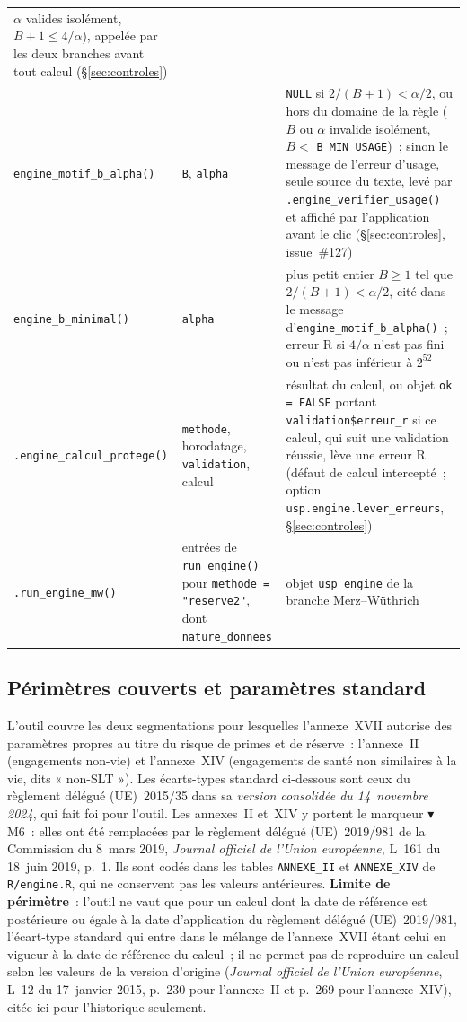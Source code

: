 \documentclass[a4paper,11pt]{article}
\newcommand{\code}[1]{\texttt{\small #1}}
\begin{document}
{\begin{longtable}{@{}p{4.6cm}p{4.0cm}p{6.2cm}@{}}
$\alpha$ valides isolément, $B + 1 \le 4/\alpha$), appelée par les deux branches avant tout calcul
(§\ref{sec:controles}) \\
\code{engine\_motif\_b\_alpha()} & \code{B}, \code{alpha} & \code{NULL} si
$2/(B+1) < \alpha/2$, ou hors du domaine de la règle ($B$ ou $\alpha$ invalide isolément,
$B <$ \code{B\_MIN\_USAGE})~; sinon le message de l'erreur d'usage, seule source du texte, levé
par \code{.engine\_verifier\_usage()} et affiché par l'application avant le clic
(§\ref{sec:controles}, issue~\#127) \\
\code{engine\_b\_minimal()} & \code{alpha} & plus petit entier $B \ge 1$ tel que
$2/(B+1) < \alpha/2$, cité dans le message d'\code{engine\_motif\_b\_alpha()}~; erreur R si
$4/\alpha$ n'est pas fini ou n'est pas inférieur à $2^{52}$ \\
\code{.engine\_calcul\_}\newline\code{protege()} & \code{methode}, horodatage,
\code{validation}, calcul & résultat du calcul, ou objet \code{ok = FALSE} portant
\code{validation\$erreur\_r} si ce calcul, qui suit une validation réussie, lève une erreur R
(défaut de calcul intercepté~; option \code{usp.engine.lever\_erreurs}, §\ref{sec:controles}) \\
\code{.run\_engine\_mw()} & entrées de \code{run\_engine()} pour
\code{methode = "reserve2"}, dont \code{nature\_donnees} & objet \code{usp\_engine} de la branche
Merz--Wüthrich \\
\end{longtable}
}

\subsection{Périmètres couverts et paramètres standard}
\label{sec:segments}

L'outil couvre les deux segmentations pour lesquelles l'annexe~XVII autorise des
paramètres propres au titre du risque de primes et de réserve~: l'annexe~II
(engagements non-vie) et l'annexe~XIV (engagements de santé non similaires à la
vie, dits « non-SLT »). Les écarts-types standard ci-dessous sont ceux du
règlement délégué (UE)~2015/35 dans sa \emph{version consolidée du
14~novembre 2024}, qui fait foi pour l'outil. Les annexes~II et~XIV y portent le
marqueur $\blacktriangledown$\,M6~: elles ont été remplacées par le règlement délégué (UE)~2019/981
de la Commission du 8~mars 2019, \emph{Journal officiel de l'Union européenne},
L~161 du 18~juin 2019, p.~1. Ils sont codés dans les tables
\code{ANNEXE\_II} et \code{ANNEXE\_XIV} de \code{R/engine.R}, qui ne conservent
pas les valeurs antérieures. \textbf{Limite de périmètre}~: l'outil ne vaut que
pour un calcul dont la date de référence est postérieure ou égale à la date
d'application du règlement délégué (UE)~2019/981, l'écart-type standard qui
entre dans le mélange de l'annexe~XVII étant celui en vigueur à la date de
référence du calcul~; il ne permet pas de reproduire un calcul selon les valeurs
de la version d'origine (\emph{Journal officiel de l'Union européenne}, L~12 du
17~janvier 2015, p.~230 pour l'annexe~II et p.~269 pour l'annexe~XIV), citée ici
pour l'historique seulement.
\end{document}
